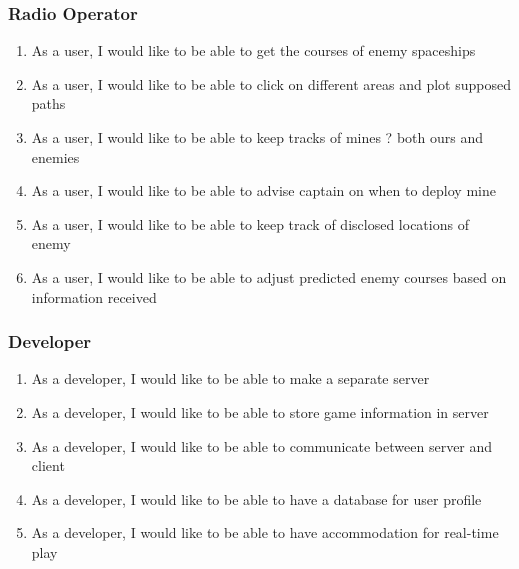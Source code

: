 \subsubsection*{Radio Operator}
\begin{enumerate}[resume, leftmargin=\listmargin]
\item As a user, I would like to be able to get the courses of enemy spaceships
\item As a user, I would like to be able to click on different areas and plot supposed paths
\item As a user, I would like to be able to keep tracks of mines ? both ours and enemies
\item As a user, I would like to be able to advise captain on when to deploy mine
\item As a user, I would like to be able to keep track of disclosed locations of enemy
\item As a user, I would like to be able to adjust predicted enemy courses based on information received
\end{enumerate}
\subsubsection*{Developer}
\begin{enumerate}[resume, leftmargin=\listmargin]
\item As a developer, I would like to be able to make a separate server
\item As a developer, I would like to be able to store game information in server
\item As a developer, I would like to be able to communicate between server and client
\item As a developer, I would like to be able to have a database for user profile
\item As a developer, I would like to be able to have accommodation for real-time play
\end{enumerate}
